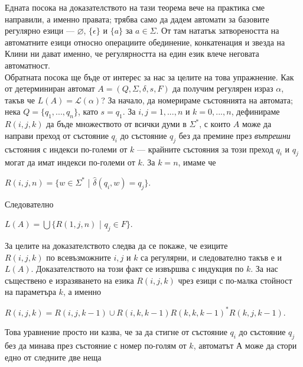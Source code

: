 \documentclass[openany]{book}
\begin{document}
            \hspace{15pt} Едната посока на доказателството на тази теорема вече на практика сме направили, а
            именно правата; трябва само да дадем автомати за базовите регулярно езици — $\varnothing$,
            $\{\epsilon\}$ и $\{a\}$ за $a \in \Sigma$. От там нататък затвореността на автоматните
            езици относно операциите обединение, конкатенация и звезда на Клини ни дават именно,
            че регулярността на един език влече неговата автоматност. \\
            \hspace{15pt} Обратната посока ще бъде от интерес за нас за целите на това упражнение.
            Как от детерминиран автомат $A = (Q,\Sigma,\delta,s,F)$ да получим регулярен израз $\alpha$, такъв че 
            $L(A) = \mathscr{L}(\alpha)$? За начало, да номерираме състоянията на автомата; нека $Q = \{q_1,...,q_n\}$, 
            като $s = q_1$. За $i,j = 1,...,n$ и $k = 0,...,n$, дефинираме $R(i,j,k)$ да бъде
            множеството от всички думи в $\Sigma^*$, с които $A$ може да направи преход от 
            състояние $q_i$ до състояние $q_j$ без да премине през \textit{вътрешни} състояния
            с индекси по-големи от $k$ — крайните състояния за този преход $q_i$ и $q_j$ могат да 
            имат индекси по-големи от $k$. За $k = n$, имаме че 
            \begin{center}
                $R(i,j,n) = \{w \in \Sigma^*$ | $\hat{\delta}(q_i,w) = q_j\}$.
            \end{center}
            Следователно
            \begin{center}
                $L(A) = \bigcup\{R(1,j,n)$ | $q_j \in F\}$.
            \end{center}
            \hspace{15pt} За целите на доказателството следва да се покаже, че езиците \\ $R(i,j,k)$
            по всевъзможните $i,j$ и $k$ са регулярни, и следователно такъв е и $L(A)$. Доказателството
            на този факт се извършва с индукция по $k$. За нас съществено е изразяването на
            езика $R(i,j,k)$ чрез езици с по-малка стойност на параметъра $k$, а именно
            \begin{center}
                $R(i,j,k) = R(i,j,k-1) \cup R(i,k,k-1)R(k,k,k-1)^*R(k,j,k-1)$.
            \end{center}
        
            Това уравнение просто ни казва, че за да стигне от състояние $q_i$ до състояние
            $q_j$ без да минава през състояние с номер по-голям от $k$, автоматът А може да 
            стори едно от следните две неща
            
\end{document}
